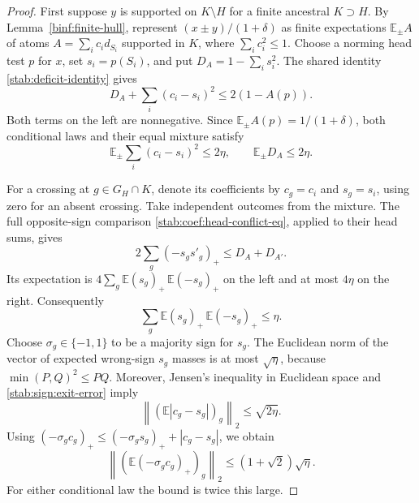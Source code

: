 \begin{proof}
First suppose $y$ is supported on $K\setminus H$ for a finite
ancestral $K\supset H$. By Lemma~\ref{binf:finite-hull}, represent
$(x\pm y)/(1+\delta)$ as finite expectations $\mathbb E_\pm A$
of atoms $A=\sum_i c_id_{S_i}$ supported in $K$, where
$\sum_i c_i^2\le1$. Choose a norming head test $p$ for $x$,
set $s_i=p(S_i)$, and put $D_A=1-\sum_i s_i^2$.
The shared identity \eqref{stab:deficit-identity} gives
\[
 D_A+\sum_i(c_i-s_i)^2\le2(1-A(p)).
\]
Both terms on the left are nonnegative. Since
$\mathbb E_\pm A(p)=1/(1+\delta)$, both conditional laws and
their equal mixture satisfy
\begin{equation}\label{stab:sign:exit-error}
 \mathbb E_\pm\sum_i(c_i-s_i)^2\le2\eta,
 \qquad \mathbb E_\pm D_A\le2\eta.
\end{equation}

For a crossing at $g\in G_H\cap K$, denote its coefficients by
$c_g=c_i$ and $s_g=s_i$, using zero for an absent crossing.
Take independent outcomes from the mixture. The full opposite-sign
comparison \eqref{stab:coef:head-conflict-eq}, applied to their head
sums, gives
\[
 2\sum_g(-s_gs'_g)_+\le D_A+D_{A'}.
\]
Its expectation is $4\sum_g\mathbb E(s_g)_+\,\mathbb E(-s_g)_+$
on the left and at most $4\eta$ on the right. Consequently
\begin{equation}\label{stab:sign:exit-conflicts}
 \sum_g\mathbb E(s_g)_+\,\mathbb E(-s_g)_+\le\eta.
\end{equation}
Choose $\sigma_g\in\{-1,1\}$ to be a majority sign for $s_g$.
The Euclidean norm of the vector of expected wrong-sign $s_g$
masses is at most $\sqrt\eta$, because
$\min(P,Q)^2\le PQ$. Moreover, Jensen's inequality in
Euclidean space and \eqref{stab:sign:exit-error} imply
\[
 \left\|(\mathbb E|c_g-s_g|)_g\right\|_2
       \le\sqrt{2\eta}.
\]
Using $(-\sigma_gc_g)_+\le(-\sigma_gs_g)_++|c_g-s_g|$,
we obtain
\begin{equation}\label{stab:sign:exit-minority}
 \left\|(\mathbb E(-\sigma_gc_g)_+)_g\right\|_2
       \le(1+\sqrt2)\sqrt\eta.
\end{equation}
For either conditional law the bound is twice this large.


\end{proof}
